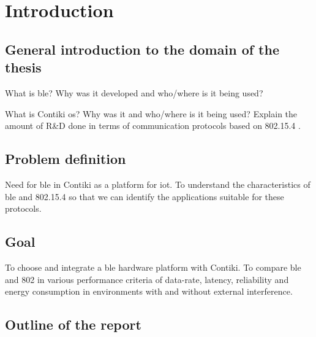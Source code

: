 \chapter{Introduction}

\section{General introduction to the domain of the thesis}

What is \gls{ble}? Why was it developed and who/where is it being used?  \cite{Gomez2012}

What is Contiki \gls{os}? Why was it and who/where is it being used? Explain the amount of R\&D done in terms of communication protocols based on 802.15.4 \cite{Contiki}.


\section{Problem definition}
Need for \gls{ble} in Contiki as a platform for \gls{iot}. To understand the characteristics of \gls{ble} and 802.15.4 so that we can identify the applications suitable for these protocols.

\section{Goal}
To choose and integrate a \gls{ble} hardware platform with Contiki. To compare \gls{ble} and 802 in various performance criteria of data-rate, latency, reliability and energy consumption in environments with and without external interference.

\section{Outline of the report}

